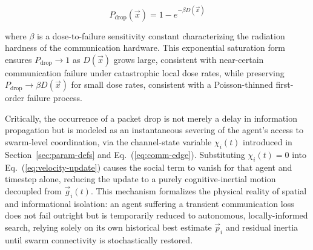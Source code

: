 \documentclass[journal]{IEEEtran}
\begin{document}
\begin{equation}
P_{\text{drop}}(\vec{x}) = 1 - e^{-\beta D(\vec{x})}
\end{equation}

where $\beta$ is a dose-to-failure sensitivity constant characterizing the radiation hardness of the communication hardware. This exponential saturation form ensures $P_{\text{drop}} \to 1$ as $D(\vec{x})$ grows large, consistent with near-certain communication failure under catastrophic local dose rates, while preserving $P_{\text{drop}} \to \beta D(\vec{x})$ for small dose rates, consistent with a Poisson-thinned first-order failure process.

Critically, the occurrence of a packet drop is not merely a delay in information propagation but is modeled as an instantaneous severing of the agent's access to swarm-level coordination, via the channel-state variable $\chi_i(t)$ introduced in Section~\ref{sec:param-defs} and Eq.~(\ref{eq:comm-edge}). Substituting $\chi_i(t) = 0$ into Eq.~(\ref{eq:velocity-update}) causes the social term to vanish for that agent and timestep alone, reducing the update to a purely cognitive-inertial motion decoupled from $\vec{g}_i(t)$. This mechanism formalizes the physical reality of spatial and informational isolation: an agent suffering a transient communication loss does not fail outright but is temporarily reduced to autonomous, locally-informed search, relying solely on its own historical best estimate $\vec{p}_i$ and residual inertia until swarm connectivity is stochastically restored.
\end{document}
